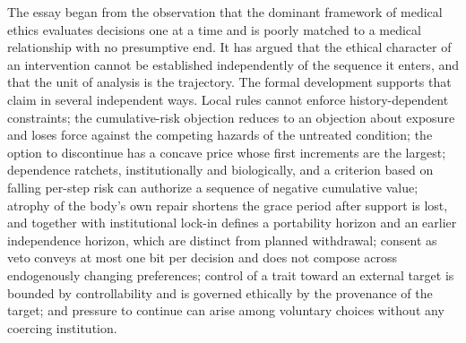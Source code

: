 \documentclass[11pt]{article}
\theoremstyle{plain}
\theoremstyle{definition}
\theoremstyle{remark}
\begin{document}
The essay began from the observation that the dominant framework of medical ethics evaluates decisions one at a time and is poorly matched to a medical relationship with no presumptive end. It has argued that the ethical character of an intervention cannot be established independently of the sequence it enters, and that the unit of analysis is the trajectory. The formal development supports that claim in several independent ways. Local rules cannot enforce history-dependent constraints; the cumulative-risk objection reduces to an objection about exposure and loses force against the competing hazards of the untreated condition; the option to discontinue has a concave price whose first increments are the largest; dependence ratchets, institutionally and biologically, and a criterion based on falling per-step risk can authorize a sequence of negative cumulative value; atrophy of the body's own repair shortens the grace period after support is lost, and together with institutional lock-in defines a portability horizon and an earlier independence horizon, which are distinct from planned withdrawal; consent as veto conveys at most one bit per decision and does not compose across endogenously changing preferences; control of a trait toward an external target is bounded by controllability and is governed ethically by the provenance of the target; and pressure to continue can arise among voluntary choices without any coercing institution.
\end{document}
